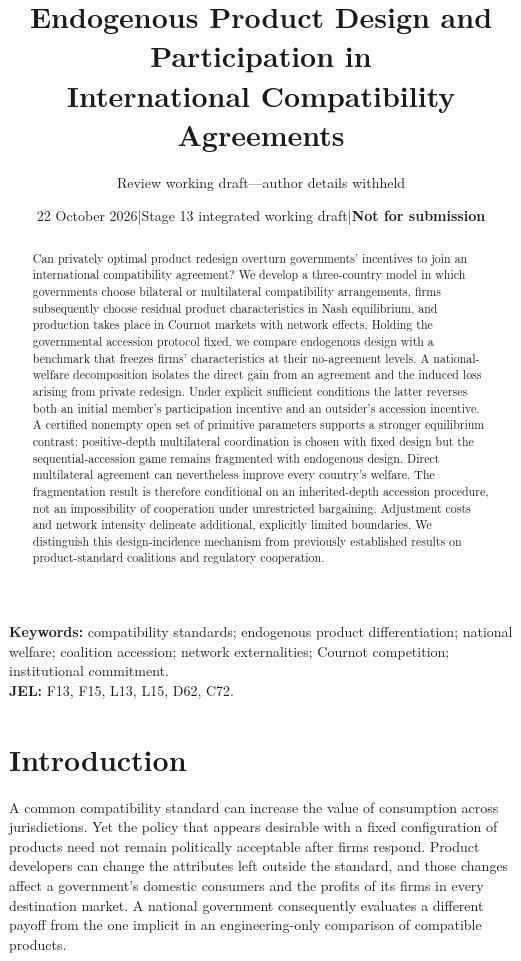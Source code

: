 \documentclass[11pt,a4paper]{article}
\title{Endogenous Product Design and Participation in\\ International Compatibility Agreements}
\author{Review working draft---author details withheld}
\date{22 October 2026\quad |\quad Stage 13 integrated working draft\quad |\quad \textbf{Not for submission}}
\theoremstyle{remark}\newtheorem{remark}[theorem]{Remark}
\begin{document}
\maketitle
\begin{abstract}
Can privately optimal product redesign overturn governments' incentives to join an international compatibility agreement? We develop a three-country model in which governments choose bilateral or multilateral compatibility arrangements, firms subsequently choose residual product characteristics in Nash equilibrium, and production takes place in Cournot markets with network effects. Holding the governmental accession protocol fixed, we compare endogenous design with a benchmark that freezes firms' characteristics at their no-agreement levels. A national-welfare decomposition isolates the direct gain from an agreement and the induced loss arising from private redesign. Under explicit sufficient conditions the latter reverses both an initial member's participation incentive and an outsider's accession incentive. A certified nonempty open set of primitive parameters supports a stronger equilibrium contrast: positive-depth multilateral coordination is chosen with fixed design but the sequential-accession game remains fragmented with endogenous design. Direct multilateral agreement can nevertheless improve every country's welfare. The fragmentation result is therefore conditional on an inherited-depth accession procedure, not an impossibility of cooperation under unrestricted bargaining. Adjustment costs and network intensity delineate additional, explicitly limited boundaries. We distinguish this design-incidence mechanism from previously established results on product-standard coalitions and regulatory cooperation.
\end{abstract}
\noindent\textbf{Keywords:} compatibility standards; endogenous product differentiation; national welfare; coalition accession; network externalities; Cournot competition; institutional commitment.\\
\textbf{JEL:} F13, F15, L13, L15, D62, C72.

\section{Introduction}
A common compatibility standard can increase the value of consumption across jurisdictions. Yet the policy that appears desirable with a fixed configuration of products need not remain politically acceptable after firms respond. Product developers can change the attributes left outside the standard, and those changes affect a government's domestic consumers and the profits of its firms in every destination market. A national government consequently evaluates a different payoff from the one implicit in an engineering-only comparison of compatible products.
\end{document}
